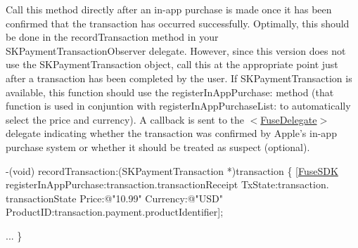 Call this method directly after an in-\/app purchase is made once it has been confirmed that the transaction has occurred successfully. Optimally, this should be done in the record\+Transaction method in your S\+K\+Payment\+Transaction\+Observer delegate. However, since this version does not use the S\+K\+Payment\+Transaction object, call this at the appropriate point just after a transaction has been completed by the user. If S\+K\+Payment\+Transaction is available, this function should use the register\+In\+App\+Purchase\+: method (that function is used in conjuntion with register\+In\+App\+Purchase\+List\+: to automatically select the price and currency). A callback is sent to the $<$\hyperlink{protocol_fuse_delegate-p}{Fuse\+Delegate}$>$ delegate indicating whether the transaction was confirmed by Apple's in-\/app purchase system or whether it should be treated as suspect (optional).


\begin{DoxyCode}
-(void) recordTransaction:(SKPaymentTransaction *)transaction
\{
   [\hyperlink{interface_fuse_s_d_k}{FuseSDK} registerInAppPurchase:transaction.transactionReceipt TxState:transaction.
      transactionState Price:\textcolor{stringliteral}{@"10.99"} Currency:\textcolor{stringliteral}{@"USD"} ProductID:transaction.payment.productIdentifier];

...
\}
\end{DoxyCode}



